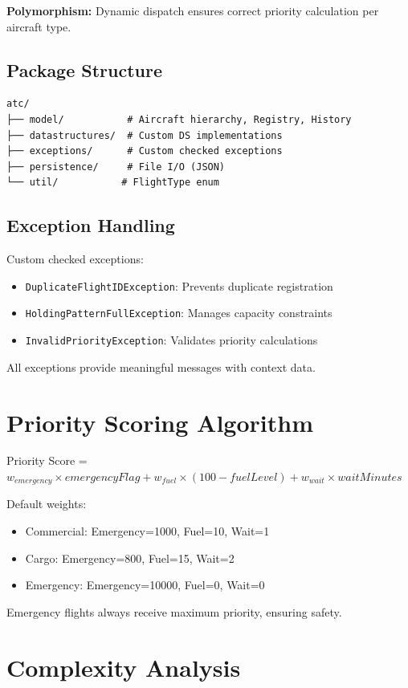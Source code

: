 \documentclass[12pt,a4paper]{article}
\begin{document}
\textbf{Polymorphism:} Dynamic dispatch ensures correct priority calculation per aircraft type.

\subsection{Package Structure}

\begin{lstlisting}
atc/
├── model/           # Aircraft hierarchy, Registry, History
├── datastructures/  # Custom DS implementations
├── exceptions/      # Custom checked exceptions
├── persistence/     # File I/O (JSON)
└── util/           # FlightType enum
\end{lstlisting}

\subsection{Exception Handling}

Custom checked exceptions:
\begin{itemize}
    \item \texttt{DuplicateFlightIDException}: Prevents duplicate registration
    \item \texttt{HoldingPatternFullException}: Manages capacity constraints
    \item \texttt{InvalidPriorityException}: Validates priority calculations
\end{itemize}

All exceptions provide meaningful messages with context data.

\section{Priority Scoring Algorithm}

Priority Score = $w_{emergency} \times emergencyFlag + w_{fuel} \times (100 - fuelLevel) + w_{wait} \times waitMinutes$

Default weights:
\begin{itemize}
    \item Commercial: Emergency=1000, Fuel=10, Wait=1
    \item Cargo: Emergency=800, Fuel=15, Wait=2
    \item Emergency: Emergency=10000, Fuel=0, Wait=0
\end{itemize}

Emergency flights always receive maximum priority, ensuring safety.

\section{Complexity Analysis}
\end{document}
